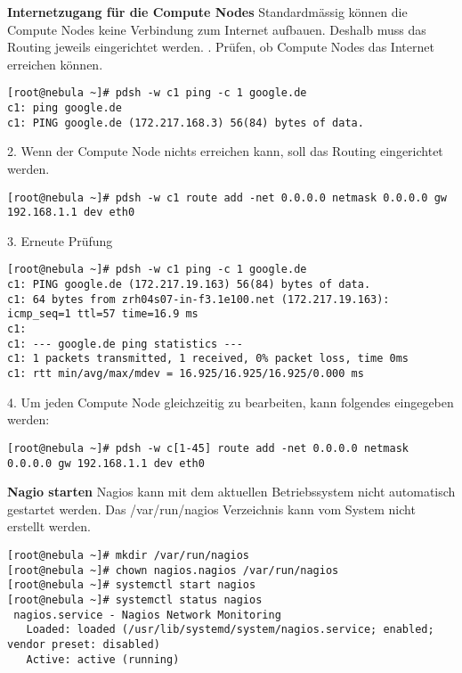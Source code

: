 \textbf{Internetzugang für die Compute Nodes}\newline
Standardmässig können die Compute Nodes keine Verbindung zum Internet aufbauen. Deshalb muss das Routing jeweils eingerichtet werden. . Prüfen, ob Compute Nodes das Internet erreichen können.
\begin{lstlisting}
[root@nebula ~]# pdsh -w c1 ping -c 1 google.de
c1: ping google.de
c1: PING google.de (172.217.168.3) 56(84) bytes of data.
\end{lstlisting}
2. Wenn der Compute Node nichts erreichen kann, soll das Routing eingerichtet werden.
\begin{lstlisting}
[root@nebula ~]# pdsh -w c1 route add -net 0.0.0.0 netmask 0.0.0.0 gw 192.168.1.1 dev eth0
\end{lstlisting}
3. Erneute Prüfung 
\begin{lstlisting}
[root@nebula ~]# pdsh -w c1 ping -c 1 google.de
c1: PING google.de (172.217.19.163) 56(84) bytes of data.
c1: 64 bytes from zrh04s07-in-f3.1e100.net (172.217.19.163): icmp_seq=1 ttl=57 time=16.9 ms
c1:
c1: --- google.de ping statistics ---
c1: 1 packets transmitted, 1 received, 0% packet loss, time 0ms
c1: rtt min/avg/max/mdev = 16.925/16.925/16.925/0.000 ms
\end{lstlisting}
4. Um jeden Compute Node gleichzeitig zu bearbeiten, kann folgendes eingegeben werden:
\begin{lstlisting}
[root@nebula ~]# pdsh -w c[1-45] route add -net 0.0.0.0 netmask 0.0.0.0 gw 192.168.1.1 dev eth0
\end{lstlisting}

\textbf{Nagio starten}\newline
Nagios kann mit dem aktuellen Betriebssystem nicht automatisch gestartet werden. Das /var/run/nagios Verzeichnis kann vom System nicht erstellt werden.
\begin{lstlisting}
[root@nebula ~]# mkdir /var/run/nagios
[root@nebula ~]# chown nagios.nagios /var/run/nagios
[root@nebula ~]# systemctl start nagios
[root@nebula ~]# systemctl status nagios
 nagios.service - Nagios Network Monitoring
   Loaded: loaded (/usr/lib/systemd/system/nagios.service; enabled; vendor preset: disabled)
   Active: active (running) 
\end{lstlisting}
\newpage
